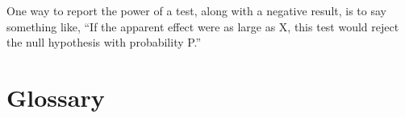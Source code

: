 \documentclass[12pt]{book}
\begin{document}
One way to report the power of a test, along with a negative result,
is to say something like, ``If the apparent effect were as large
as X, this test would reject the null hypothesis with probability P.''















\section{Glossary}
\end{document}
